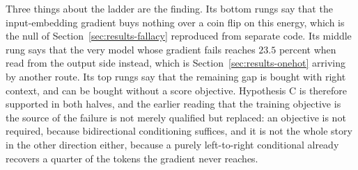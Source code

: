 Three things about the ladder are the finding. Its bottom rungs say that the input-embedding gradient buys nothing over a coin flip on this energy, which is the null of Section~\ref{sec:results-fallacy} reproduced from separate code. Its middle rung says that the very model whose gradient fails reaches $23.5$ percent when read from the output side instead, which is Section~\ref{sec:results-onehot} arriving by another route. Its top rungs say that the remaining gap is bought with right context, and can be bought without a score objective. Hypothesis C is therefore supported in both halves, and the earlier reading that the training objective is the source of the failure is not merely qualified but replaced: an objective is not required, because bidirectional conditioning suffices, and it is not the whole story in the other direction either, because a purely left-to-right conditional already recovers a quarter of the tokens the gradient never reaches.
